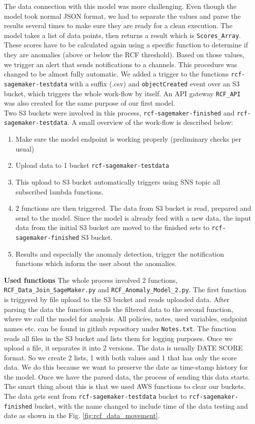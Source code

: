 The data connection with this model was more challenging. Even though the model took normal JSON format, we had to separate the values and parse the results several times to make sure they are ready for a clean execution. The model takes a list of data points, then returns a result which is \verb|Scores_Array|. These scores have to be calculated again using a specific function to determine if they are anomalies (above or below the RCF threshold). Based on those values, we trigger an alert that sends notifications to a channels. This procedure was changed to be almost fully automatic. We added a trigger to the functions \verb|rcf-sagemaker-testdata| with a suffix (.csv) and \verb|objectCreated| event over an S3 bucket, which triggers the whole work-flow by itself. An API gateway \verb|RCF_API| was also created for the same purpose of our first model.\\

Two S3 buckets were involved in this process, \verb|rcf-sagemaker-finished| and \verb|rcf-sagemaker-testdata|. A small overview of the work-flow is described below:
\begin{enumerate}
\item Make sure the model endpoint is working properly (preliminary checks per usual)
\item Upload data to 1 bucket \verb|rcf-sagemaker-testdata|
\item This upload to S3 bucket automatically triggers using SNS topic all subscribed lambda functions.
\item 2 functions are then triggered. The data from S3 bucket is read, prepared and send to the model. Since the model is already feed with a new data, the input data from the initial S3 bucket are moved to the finished sets to \verb|rcf-sagemaker-finished| S3 bucket.
\item Results and especially the anomaly detection, trigger the notification functions which inform the user about the anomalies.
\end{enumerate}

\textbf{Used functions}
The whole process involved 2 functions, \verb|RCF_Data_Join_SageMaker.py| and \verb|RCF_Anomaly_Model_2.py|. The first function is triggered by file upload to the S3 bucket and reads uploaded data. After parsing the data the function sends the filtered data to the second function, where we call the model for analysis.
All policies, notes, used variables, endpoint names etc. can be found in github repository under \verb|Notes.txt|.
The function reads all files in the S3 bucket and lists them for logging purposes. Once we upload a file, it separates it into 2 versions. The data is usually DATE SCORE format.
So we create 2 lists, 1 with both values and 1 that has only the score data. We do this because we want to preserve the date as time-stamp history for the model.
Once we have the parsed data, the process of sending this data starts. The smart thing about this is that we used AWS functions to clear our buckets. The data gets sent from \verb|rcf-sagemaker-testdata| bucket to \verb|rcf-sagemaker-finished| bucket, with the name changed to include time of the data testing and date as shown in the Fig. \ref{fig:rcf_data_movement}.\\

